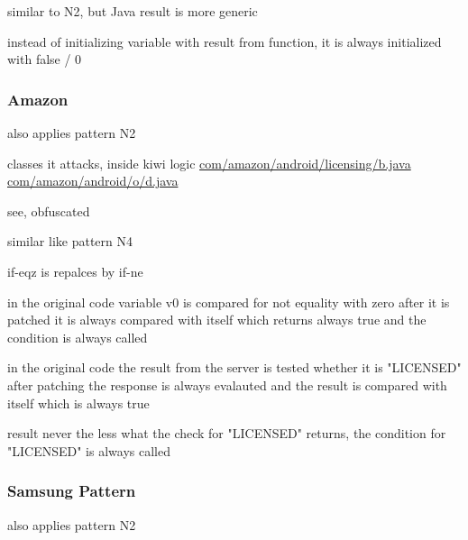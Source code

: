 similar to N2, but Java result is more generic



instead of initializing variable with result from function, it is always initialized with false / 0
\subsubsection{Amazon}
also applies pattern N2

classes it attacks, inside kiwi logic
\url{com/amazon/android/licensing/b.java}
\url{com/amazon/android/o/d.java}

see, obfuscated

similar like pattern N4



if-eqz is repalces by if-ne


in the original code variable v0 is compared for not equality with zero
after it is patched it is always compared with itself which returns always true and the condition is always called



in the original code the result from the server is tested whether it is "LICENSED"
after patching the response is always evalauted and the result is compared with itself which is always true

result
never the less what the check for "LICENSED" returns, the condition for "LICENSED" is always called
\subsubsection{Samsung Pattern}
also applies pattern N2

